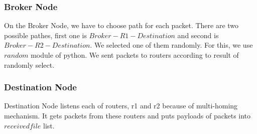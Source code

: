 \documentclass[conference]{IEEEtran}
\begin{document}
\subsubsection{Broker Node}
On the Broker Node, we have to choose path for each packet. There are two possible pathes, first one is $Broker-R1-Destination$ and second is $Broker-R2-Destination$. We selected one of them randomly. For this, we use $random$ module of python. We sent packets to routers according to result of randomly select. 
\subsubsection{Destination Node}
Destination Node listens each of routers, r1 and r2 because of multi-homing mechanism. It gets packets from these routers and puts payloads of packets into $receivedfile$ list.
\end{document}
